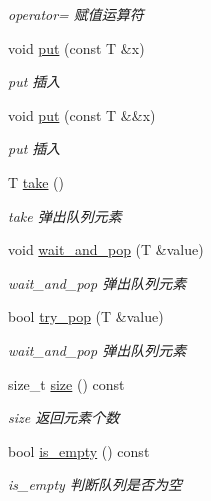 \begin{DoxyCompactItemize}
\begin{DoxyCompactList}\small\item\em operator= 赋值运算符 \end{DoxyCompactList}\item 
void \hyperlink{classBlockingQueue_a1c824f8d644951d25bed9825794ddeae}{put} (const T \&x)
\begin{DoxyCompactList}\small\item\em put 插入 \end{DoxyCompactList}\item 
void \hyperlink{classBlockingQueue_acedd6887a4af752440fb2dcd04292fa3}{put} (const T \&\&x)
\begin{DoxyCompactList}\small\item\em put 插入 \end{DoxyCompactList}\item 
T \hyperlink{classBlockingQueue_aac788baea510940fc40961a285bacc5f}{take} ()
\begin{DoxyCompactList}\small\item\em take 弹出队列元素 \end{DoxyCompactList}\item 
void \hyperlink{classBlockingQueue_a8efc43c38666a38402c39f772da63fcf}{wait\+\_\+and\+\_\+pop} (T \&value)
\begin{DoxyCompactList}\small\item\em wait\+\_\+and\+\_\+pop 弹出队列元素 \end{DoxyCompactList}\item 
bool \hyperlink{classBlockingQueue_a47a2d7726112b4e2d7b3f65a4e84aa06}{try\+\_\+pop} (T \&value)
\begin{DoxyCompactList}\small\item\em wait\+\_\+and\+\_\+pop 弹出队列元素 \end{DoxyCompactList}\item 
size\+\_\+t \hyperlink{classBlockingQueue_a733361d5721c6ba64af3e129921c43b0}{size} () const
\begin{DoxyCompactList}\small\item\em size 返回元素个数 \end{DoxyCompactList}\item 
bool \hyperlink{classBlockingQueue_a06f9211f5225bb6413f403e8d14ca7ce}{is\+\_\+empty} () const
\begin{DoxyCompactList}\small\item\em is\+\_\+empty 判断队列是否为空 \end{DoxyCompactList}\end{DoxyCompactItemize}


